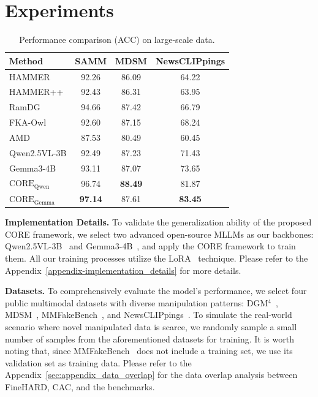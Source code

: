 \documentclass{article}
\theoremstyle{plain}
\theoremstyle{definition}
\theoremstyle{remark}
\begin{document}
\section{Experiments}

\begin{table}[t]
\centering
\setlength{\tabcolsep}{4pt} 
\caption{
Performance comparison (ACC) on large-scale data.
}
\begin{tabular}{l ccc}
\toprule
\textbf{Method} & \textbf{SAMM} & \textbf{MDSM} & \textbf{NewsCLIPpings} \\
\midrule

HAMMER & 92.26 & 86.09 & 64.22 \\
HAMMER++ & 92.43 & 86.31 & 63.95 \\
RamDG & 94.66 & 87.42 & 66.79 \\
\midrule 

FKA-Owl & 92.60 & 87.15 & 68.24 \\
AMD & 87.53 & 80.49 & 60.45 \\
Qwen2.5VL-3B & 92.49 & 87.23 & 71.43 \\
Gemma3-4B & 93.11 & 87.07 & 73.65 \\
\midrule 

\rowcolor{LightGreen}
\textbf{$\text{CORE}_\text{Qwen}$} & 96.74 & \textbf{88.49} & 81.87 \\
\rowcolor{LightGreen}
\textbf{$\text{CORE}_\text{Gemma}$} & \textbf{97.14} & 87.61 & \textbf{83.45} \\
\bottomrule
\end{tabular}
\small
\label{tab:large-scale}
\vspace{-0.4cm}
\end{table}

\noindent\textbf{Implementation Details.}
To validate the generalization ability of the proposed CORE framework, we select two advanced open-source MLLMs as our backbones: Qwen2.5VL-3B~\cite{qwen2.5vl} and Gemma3-4B~\cite{gemma3}, and apply the CORE framework to train them. All our training processes utilize the LoRA~\cite{lora} technique. Please refer to the Appendix~\ref{appendix-implementation_details} for more details.

\noindent\textbf{Datasets.}
To comprehensively evaluate the model's performance,  
we select four public multimodal datasets with diverse manipulation patterns: DGM$^4$~\cite{dgm4}, MDSM~\cite{mdsm}, MMFakeBench~\cite{mmfakebench}, and NewsCLIPpings~\cite{newsclippings}. To simulate the real-world scenario where novel manipulated data is scarce, we randomly sample a small number of samples from the aforementioned datasets for training. It is worth noting that, since MMFakeBench~\cite{mmfakebench} does not include a training set, we use its validation set as training data. Please refer to the Appendix~\ref{sec:appendix_data_overlap} for the data overlap analysis between FineHARD, CAC, and the benchmarks.
\end{document}
